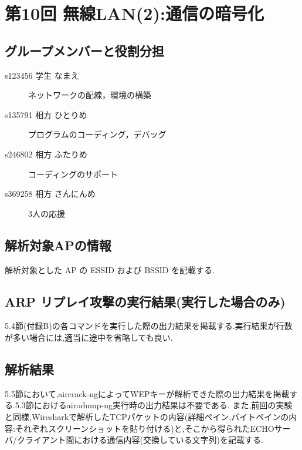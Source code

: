 \documentclass[a4j]{celb-report}
\begin{document}

\newpage
\section{第10回 無線LAN(2):通信の暗号化}
\subsection{グループメンバーと役割分担}
%
\begin{description}
 \item[s123456 学生 なまえ] ネットワークの配線，環境の構築
 \item[s135791 相方 ひとりめ] プログラムのコーディング，デバッグ
 \item[s246802 相方 ふたりめ] コーディングのサポート
 \item[s369258 相方 さんにんめ] 3人の応援
\end{description}
\setcounter{subsection}{2}
\subsection{解析対象APの情報}
解析対象とした AP の ESSID および BSSID を記載する.
\subsection{ARP リプレイ攻撃の実行結果(実行した場合のみ)}
5.4節(付録B)の各コマンドを実行した際の出力結果を掲載する.実行結果が行数が多い場合には,適当に途中を省略しても良い.
\subsection{解析結果}
5.5節において,aircrack-ngによってWEPキーが解析できた際の出力結果を掲載する.5.3節におけるairodump-ng実行時の出力結果は不要である.
また,前回の実験と同様,Wiresharkで解析したTCPパケットの内容(詳細ペイン,バイトペインの内容:それぞれスクリーンショットを貼り付ける)と,そこから得られたECHOサーバ/クライアント間における通信内容(交換している文字列)を記載する.
\end{document}
